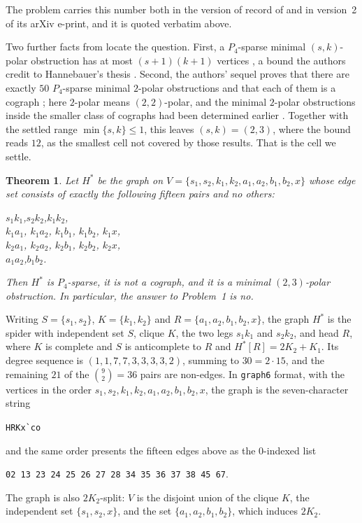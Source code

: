 \documentclass[11pt]{amsart}
\newtheorem{theorem}{Theorem}
\theoremstyle{definition}
\theoremstyle{remark}
\newcommand{\Hstar}{H^{*}}
\begin{document}
The problem carries this number both in the version of record of \cite{CMHC24} and in
version~2 of its arXiv e-print, and it is quoted verbatim above.

Two further facts from \cite{CMHC24} locate the question. First, a $P_4$-sparse minimal
$(s,k)$-polar obstruction has at most $(s+1)(k+1)$ vertices \cite[Theorem~57]{CMHC24}, a bound
the authors credit to Hannebauer's thesis \cite{Hannebauer}. Second, the authors' sequel proves
that there are exactly $50$ $P_4$-sparse minimal $2$-polar obstructions and that each of them
is a cograph \cite{CMHC22polar}; here $2$-polar means $(2,2)$-polar, and the minimal $2$-polar
obstructions inside the smaller class of cographs had been determined earlier
\cite{HellHCLS}. Together with the settled range $\min\{s,k\}\le1$, this leaves
$(s,k)=(2,3)$, where the bound reads $12$, as the smallest cell not covered by those results.
That is the cell we settle.

\begin{theorem}\label{thm:main}
Let $\Hstar$ be the graph on
$V=\{s_1,s_2,k_1,k_2,a_1,a_2,b_1,b_2,x\}$ whose edge set consists of exactly the following
fifteen pairs and no others:
\begin{center}
$s_1k_1$,\quad $s_2k_2$,\quad $k_1k_2$,\\
$k_1a_1$,\; $k_1a_2$,\; $k_1b_1$,\; $k_1b_2$,\; $k_1x$,\\
$k_2a_1$,\; $k_2a_2$,\; $k_2b_1$,\; $k_2b_2$,\; $k_2x$,\\
$a_1a_2$,\quad $b_1b_2$.
\end{center}
Then $\Hstar$ is $P_4$-sparse, it is not a cograph, and it is a minimal $(2,3)$-polar
obstruction. In particular, the answer to Problem~1 is \emph{no}.
\end{theorem}

Writing $S=\{s_1,s_2\}$, $K=\{k_1,k_2\}$ and $R=\{a_1,a_2,b_1,b_2,x\}$, the graph $\Hstar$ is
the spider \cite{JamisonOlariu} with independent set $S$, clique $K$, the two legs $s_1k_1$
and $s_2k_2$, and head
$R$, where $K$ is complete and $S$ is anticomplete to $R$ and $\Hstar[R]=2K_2+K_1$. Its degree
sequence is $(1,1,7,7,3,3,3,3,2)$, summing to $30=2\cdot15$, and the remaining $21$ of the
$\binom92=36$ pairs are non-edges. In \texttt{graph6} format, with the vertices in the order
$s_1,s_2,k_1,k_2,a_1,a_2,b_1,b_2,x$, the graph is the seven-character string
\begin{center}
\verb|HRKx`co|
\end{center}
and the same order presents the fifteen edges above as the $0$-indexed list
\begin{center}
\texttt{02 13 23 24 25 26 27 28 34 35 36 37 38 45 67}.
\end{center}
The graph is also $2K_2$-split: $V$ is the disjoint union of the clique $K$, the independent
set $\{s_1,s_2,x\}$, and the set $\{a_1,a_2,b_1,b_2\}$, which induces $2K_2$.
\end{document}
